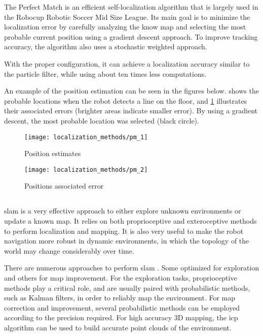 The Perfect Match \cite{Lauer2006a,Pinto1963} is an efficient self-localization algorithm that is largely used in the Robocup Robotic Soccer Mid Size League. Its main goal is to minimize the localization error by carefully analyzing the know map and selecting the most probable current position using a gradient descent approach. To improve tracking accuracy, the algorithm also uses a stochastic weighted approach.

With the proper configuration, it can achieve a localization accuracy similar to the particle filter, while using about ten times less computations.

An example of the position estimation can be seen in the figures below.  shows the probable locations when the robot detects a line on the floor, and \cref{fig:localization-methods_pm-2} illustrates their associated errors (brighter areas indicate smaller error). By using a gradient descent, the most probable location was selected (black circle).

\begin{figure}[H]
	\centering
	\begin{minipage}[h]{.495\textwidth}
		\centering
		\texttt{[image: localization\_methods/pm\_1]}
		\caption{Position estimates}
		\label{fig:localization-methods_pm-1}
	\end{minipage}\hfill
	\begin{minipage}[h]{.495\textwidth}
		\centering
		\texttt{[image: localization\_methods/pm\_2]}
		\caption{Positions associated error}
		\label{fig:localization-methods_pm-2}
	\end{minipage}
\end{figure}


\subsection{}

\gls{slam} \cite{Thrun2002} is a very effective approach to either explore unknown environments or update a known map. It relies on both proprioceptive and exteroceptive methods to perform localization and mapping. It is also very useful to make the robot navigation more robust in dynamic environments, in which the topology of the world may change considerably over time.

There are numerous approaches to perform  \gls{slam} \cite{Tuna2012}. Some optimized for exploration and others for map improvement. For the exploration tasks, proprioceptive methods play a critical role, and are usually paired with probabilistic methods, such as Kalman filters, in order to reliably map the environment. For map correction and improvement, several probabilistic methods can be employed according to the precision required. For high accuracy 3D mapping, the \gls{icp} algorithm can be used to build accurate point clouds of the environment.



